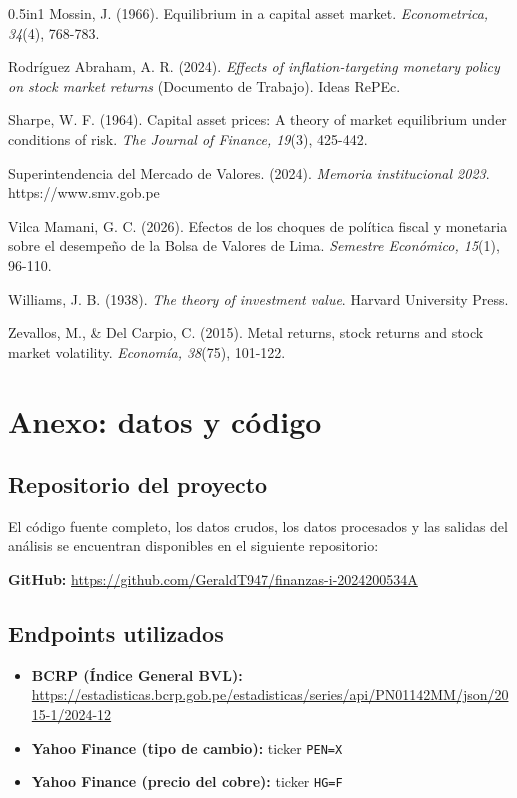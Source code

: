 \documentclass[12pt, a4paper]{article}
\begin{document}
\begin{hangparas}{0.5in}{1}
Mossin, J. (1966). Equilibrium in a capital asset market. \textit{Econometrica, 34}(4), 768-783.

Rodríguez Abraham, A. R. (2024). \textit{Effects of inflation-targeting monetary policy on stock market returns} (Documento de Trabajo). Ideas RePEc.

Sharpe, W. F. (1964). Capital asset prices: A theory of market equilibrium under conditions of risk. \textit{The Journal of Finance, 19}(3), 425-442.

Superintendencia del Mercado de Valores. (2024). \textit{Memoria institucional 2023}. https://www.smv.gob.pe

Vilca Mamani, G. C. (2026). Efectos de los choques de política fiscal y monetaria sobre el desempeño de la Bolsa de Valores de Lima. \textit{Semestre Económico, 15}(1), 96-110.

Williams, J. B. (1938). \textit{The theory of investment value}. Harvard University Press.

Zevallos, M., \& Del Carpio, C. (2015). Metal returns, stock returns and stock market volatility. \textit{Economía, 38}(75), 101-122.

\end{hangparas}

\newpage
\section*{Anexo: datos y código}

\subsection*{Repositorio del proyecto}

El código fuente completo, los datos crudos, los datos procesados y las salidas del análisis se encuentran disponibles en el siguiente repositorio:

\vspace{0.3cm}
\noindent
\textbf{GitHub:} \url{https://github.com/GeraldT947/finanzas-i-2024200534A}

\subsection*{Endpoints utilizados}

\begin{itemize}
    \item \textbf{BCRP (Índice General BVL):} \url{https://estadisticas.bcrp.gob.pe/estadisticas/series/api/PN01142MM/json/2015-1/2024-12}
    \item \textbf{Yahoo Finance (tipo de cambio):} ticker \texttt{PEN=X}
    \item \textbf{Yahoo Finance (precio del cobre):} ticker \texttt{HG=F}
\end{itemize}
\end{document}
